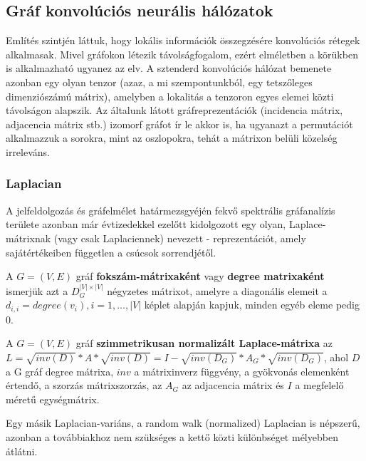 \subsection{Gráf konvolúciós neurális hálózatok} %
Említés szintjén láttuk, hogy lokális információk összegzésére konvolúciós rétegek alkalmasak. Mivel gráfokon létezik távolságfogalom, ezért elméletben a körükben is alkalmazható ugyanez az elv. A sztenderd konvolúciós hálózat bemenete azonban egy olyan tenzor (azaz, a mi szempontunkból, egy tetszőleges dimenziószámú mátrix), amelyben a lokalitás a tenzoron egyes elemei közti távolságon alapszik. Az általunk látott gráfreprezentációk (incidencia mátrix, adjacencia mátrix stb.) izomorf gráfot ír le akkor is, ha ugyanazt a permutációt alkalmazzuk a sorokra, mint az oszlopokra, tehát a mátrixon belüli közelség irreleváns.

\subsubsection{Laplacian}
A jelfeldolgozás és gráfelmélet határmezsgyéjén fekvő spektrális gráfanalízis területe azonban már évtizedekkel ezelőtt kidolgozott egy olyan, Laplace-mátrixnak (vagy csak Laplaciennek) nevezett - reprezentációt\cite{spectral_graph}, amely sajátértékeiben független a csúcsok sorrendjétől.

\begin{definition}
A $G=(V,E)$ gráf \textbf{fokszám-mátrixaként} vagy \textbf{degree matrixaként} ismerjük azt a $D_G^{|V| \times |V|}$ négyzetes mátrixot, amelyre a diagonális elemeit a $d_{i,i} = degree(v_i), i=1, \ldots, |V|$ képlet alapján kapjuk, minden egyéb eleme pedig 0.
\end{definition}

\begin{definition}
A $G=(V,E)$ gráf \textbf{szimmetrikusan normalizált Laplace-mátrixa} az $L = \sqrt{inv(D)} * A * \sqrt{inv(D)} = I - \sqrt{inv(D_G)} * A_G * \sqrt{inv(D_G)}$, ahol $D$ a G gráf degree mátrixa, $inv$ a mátrixinverz függvény, a gyökvonás elemenként értendő, a szorzás mátrixszorzás, az $A_G$ az adjacencia mátrix és $I$ a megfelelő méretű egységmátrix.
\end{definition}

\begin{note}
Egy másik Laplacian-variáns, a random walk (normalized) Laplacian is népszerű, azonban a továbbiakhoz nem szükséges a kettő közti különbséget mélyebben átlátni.
\end{note}

